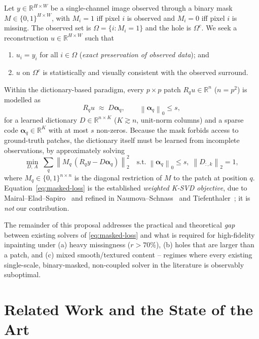 \documentclass[11pt,a4paper]{article}
\theoremstyle{definition}
\theoremstyle{remark}
\newcommand{\R}{\mathbb{R}}
\newcommand{\norm}[1]{\left\lVert #1 \right\rVert}
\newcommand{\alphavec}{\bm{\alpha}}
\begin{document}
Let $y\in\R^{H\times W}$ be a single-channel image observed through a
binary mask $M\in\{0,1\}^{H\times W}$, with $M_i=1$ iff pixel $i$ is
observed and $M_i=0$ iff pixel $i$ is missing. The observed set is
$\Omega=\{i:M_i=1\}$ and the hole is $\Omega^c$. We seek a
reconstruction $u\in\R^{H\times W}$ such that
\begin{enumerate}[label=(\roman*),itemsep=2pt]
\item $u_i = y_i$ for all $i\in\Omega$ (\emph{exact preservation of
  observed data}); and
\item $u$ on $\Omega^c$ is statistically and visually consistent with
  the observed surround.
\end{enumerate}
Within the dictionary-based paradigm, every $p\times p$ patch
$R_q u\in\R^n$ ($n=p^2$) is modelled as
\begin{equation}
R_q u \;\approx\; D \alphavec_q,\qquad \norm{\alphavec_q}_0\le s,
\label{eq:patch-model}
\end{equation}
for a learned dictionary $D\in\R^{n\times K}$ ($K\gtrsim n$,
unit-norm columns) and a sparse code
$\alphavec_q\in\R^K$ with at most $s$ non-zeros. Because the mask
forbids access to ground-truth patches, the dictionary itself must be
learned from incomplete observations, by approximately solving
\begin{equation}
\min_{D,\,A}\;
\sum_{q} \norm{M_q\,(R_q y - D\alphavec_q)}_2^2
\quad\text{s.t.}\;\norm{\alphavec_q}_0\le s,\;\norm{D_{:,k}}_2=1,
\label{eq:masked-loss}
\end{equation}
where $M_q\in\{0,1\}^{n\times n}$ is the diagonal restriction of $M$
to the patch at position $q$. Equation~\eqref{eq:masked-loss} is the
established \emph{weighted K-SVD objective}, due to
Mairal--Elad--Sapiro~\cite{mairal2008sparse} and refined in
Naumova--Schnass~\cite{naumova2018itkrmm} and
Tiefenthaler~\cite{tiefenthaler2018thesis}; it is \emph{not} our
contribution.

The remainder of this proposal addresses the practical and theoretical
\emph{gap} between existing solvers of \eqref{eq:masked-loss} and what
is required for high-fidelity inpainting under (a) heavy missingness
($r>70\%$), (b) holes that are larger than a patch, and (c) mixed
smooth/textured content -- regimes where every existing single-scale,
binary-masked, non-coupled solver in the literature is observably
suboptimal.

\section{Related Work and the State of the Art}
\label{sec:related}
\end{document}
